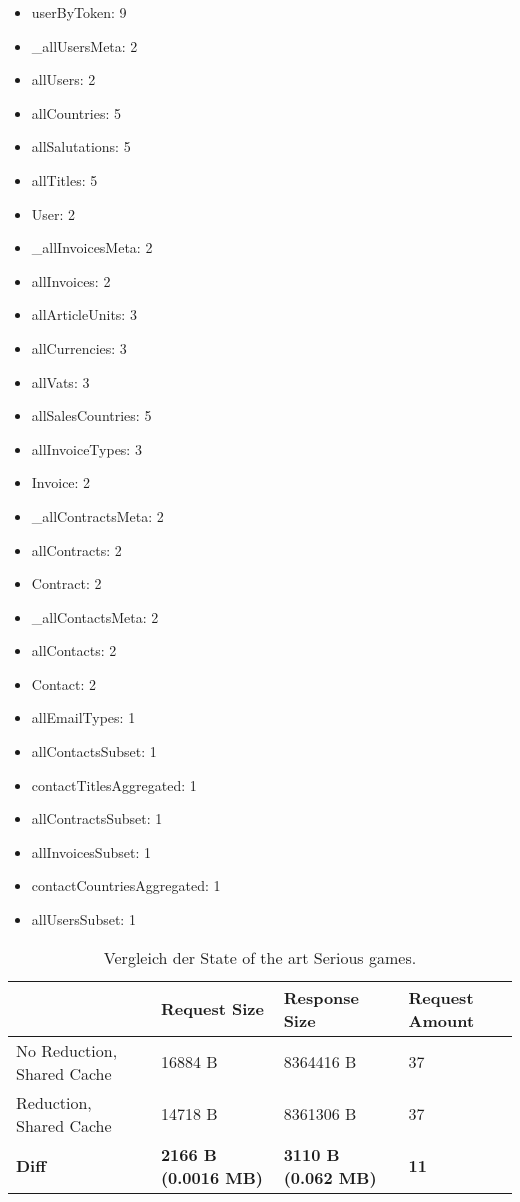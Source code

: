 \begin{itemize}
  \item userByToken: 9
  \item \_allUsersMeta: 2
  \item allUsers: 2
  \item allCountries: 5
  \item allSalutations: 5
  \item allTitles: 5
  \item User: 2
  \item \_allInvoicesMeta: 2
  \item allInvoices: 2
  \item allArticleUnits: 3
  \item allCurrencies: 3
  \item allVats: 3
  \item allSalesCountries: 5
  \item allInvoiceTypes: 3
  \item Invoice: 2
  \item \_allContractsMeta: 2
  \item allContracts: 2
  \item Contract: 2
  \item \_allContactsMeta: 2
  \item allContacts: 2
  \item Contact: 2
  \item allEmailTypes: 1
  \item allContactsSubset: 1
  \item contactTitlesAggregated: 1
  \item allContractsSubset: 1
  \item allInvoicesSubset: 1
  \item contactCountriesAggregated: 1
  \item allUsersSubset: 1
\end{itemize}

\begin{table}[]
    \begin{tabular}{|l|l|l|l|}
    \hline
                                    & Request Size & Response Size & Request Amount  \\
    \hline
     No Reduction, Shared Cache     &  16884 B        &  8364416 B   & 37 \\
     \hline
     Reduction, Shared Cache        &  14718 B        &  8361306 B   & 37 \\
     \hline
    \textbf{Diff}                   & \textbf{2166 B (0.0016 MB)} & \textbf{3110 B (0.062  MB)} & \textbf{11} \\
     \hline
    \end{tabular}
    \caption{Vergleich der State of the art Serious games.}
    \label{tab:serious-game-comparison}
\end{table}

